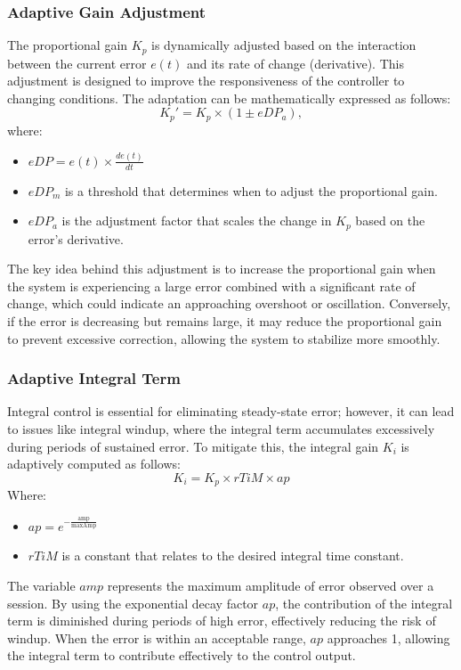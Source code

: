 \documentclass[a4paper,12pt]{article}
\begin{document}
\subsubsection{Adaptive Gain Adjustment}
The proportional gain $K_p$ is dynamically adjusted based on the interaction between the current error $e(t)$ and its rate of change (derivative). This adjustment is designed to improve the responsiveness of the controller to changing conditions. The adaptation can be mathematically expressed as follows:
$$
K_p' = K_p \times (1 \pm eDP_a),
$$
where:
\begin{itemize}
\item $eDP = e(t) \times \frac{de(t)}{dt}$
\item $eDP_m$ is a threshold that determines when to adjust the proportional gain.
\item $eDP_a$ is the adjustment factor that scales the change in $K_p$ based on the error’s derivative. 
\end{itemize}
The key idea behind this adjustment is to increase the proportional gain when the system is experiencing a large error combined with a significant rate of change, which could indicate an approaching overshoot or oscillation. Conversely, if the error is decreasing but remains large, it may reduce the proportional gain to prevent excessive correction, allowing the system to stabilize more smoothly.
\subsubsection{Adaptive Integral Term}
Integral control is essential for eliminating steady-state error; however, it can lead to issues like integral windup, where the integral term accumulates excessively during periods of sustained error. To mitigate this, the integral gain $K_i$ is adaptively computed as follows:
$$
K_i = K_p \times rTiM \times ap
$$
Where:
\begin{itemize}
\item $ap = e^{-\frac{\text{amp}}{\text{maxAmp}}}$
\item $rTiM$ is a constant that relates to the desired integral time constant.
\end{itemize}
The variable $amp$ represents the maximum amplitude of error observed over a session. By using the exponential decay factor $ap$, the contribution of the integral term is diminished during periods of high error, effectively reducing the risk of windup. When the error is within an acceptable range, $ap$ approaches 1, allowing the integral term to contribute effectively to the control output.
\end{document}

